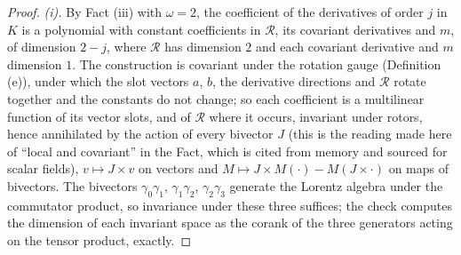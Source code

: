 \begin{proof}
\emph{(i).} By Fact (iii) with $\omega = 2$, the coefficient of the derivatives of order $j$ in $K$ is a polynomial with constant coefficients in $\mathcal{R}$, its covariant derivatives and $m$, of dimension $2 - j$, where $\mathcal{R}$ has dimension $2$ and each covariant derivative and $m$ dimension $1$. The construction is covariant under the rotation gauge (Definition (e)), under which the slot vectors $a$, $b$, the derivative directions and $\mathcal{R}$ rotate together and the constants do not change; so each coefficient is a multilinear function of its vector slots, and of $\mathcal{R}$ where it occurs, invariant under rotors, hence annihilated by the action of every bivector $J$ (this is the reading made here of ``local and covariant'' in the Fact, which is cited from memory and sourced for scalar fields), $v \mapsto J\times v$ on vectors and $M \mapsto J\times M(\cdot) - M(J\times\cdot)$ on maps of bivectors. The bivectors $\gamma_{0}\gamma_{1}$, $\gamma_{1}\gamma_{2}$, $\gamma_{2}\gamma_{3}$ generate the Lorentz algebra under the commutator product, so invariance under these three suffices; the check computes the dimension of each invariant space as the corank of the three generators acting on the tensor product, exactly.


\end{proof}
